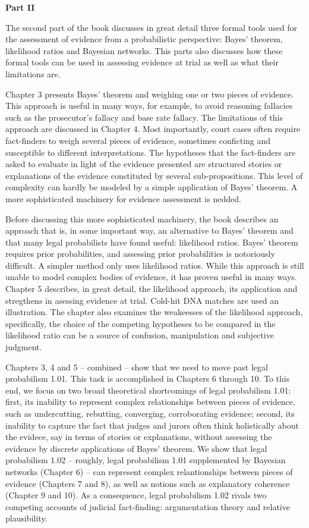 \documentclass[10pt,dvipsnames,enabledeprecatedfontcommands]{scrartcl}
\begin{document}
\vspace{3mm}

\noindent \textbf{Part II}

\noindent The second part of the book discusses in great detail three
formal tools used for the assessment of evidence from a probabilistic
perspective: Bayes' theorem, likelihood ratios and Bayesian networks.
This parts also discusses how these formal tools can be used in
assessing evidence at trial as well as what their limitations are.

Chapter 3 presents Bayes' theorem and weighing one or two pieces of
evidence. This approach is useful in many ways, for example, to avoid
reasoning fallacies such as the prosecutor's fallacy and base rate
fallacy. The limitations of this approach are discussed in Chapter 4.
Most importantly, court cases often require fact-finders to weigh
several pieces of evidence, sometimes conficting and susceptible to
different interpretations. The hypotheses that the fact-finders are
asked to evaluate in light of the evidence presented are structured
stories or explanations of the evidence constituted by several
sub-propositions. This level of complexity can hardly be modeled by a
simple application of Bayes' theorem. A more sophisticated machinery for
evidence assessment is nedded.

Before discussing this more sophisticated machinery, the book describes
an approach that is, in some important way, an alternative to Bayes'
theorem and that many legal probabilists have found useful: likelihood
ratios. Bayes' theorem requires prior probabilities, and assessing prior
probabilities is notoriously difficult. A simpler method only uses
likelihood ratios. While this approach is still unable to model complex
bodies of evidence, it has proven useful in many ways. Chapter 5
describes, in great detail, the likelihood approach, its application and
stregthens in asessing evidence at trial. Cold-hit DNA matches are used
an illustration. The chapter also examines the weakeesses of the
likelihood approach, specifically, the choice of the competing
hypotheses to be compared in the likelihood ratio can be a source of
confusion, manipulation and subjective judgment.

Chapters 3, 4 and 5 -- combined -- show that we need to move past legal
probabilism 1.01. This task is accomplished in Chapters 6 through 10. To
this end, we focus on two broad theoretical shortcomings of legal
probabilism 1.01: first, its inability to represent complex
relationships between pieces of evidence, such as undercutting,
rebutting, converging, corroborating evidence; second, its inability to
capture the fact that judges and jurors often think holistically about
the evidece, say in terms of stories or explanations, without assessing
the evidence by discrete applications of Bayes' theorem. We show that
legal probabilism 1.02 -- roughly, legal probabilism 1.01 supplemented
by Bayesian networks (Chapter 6) -- can represent complex relantionships
between pieces of evidence (Chapters 7 and 8), as well as notions such
as explanatory coherence (Chapter 9 and 10). As a consequence, legal
probabilism 1.02 rivals two competing accounts of judicial fact-finding:
argumentation theory and relative plausibility.
\end{document}
